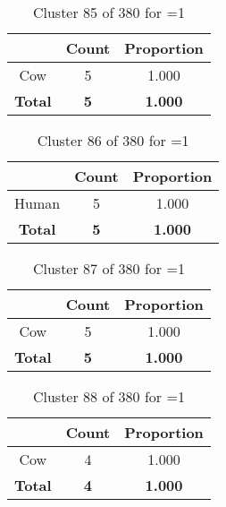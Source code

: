 \begin{table}[ht!]
\centering
\begin{tabular}{|c|c|c|}
\hline
\bf \Spec{} &\bf Count &\bf Proportion\\ \hline \hline
Cow & 5 & 1.000\\ \hline
\hline
\bf Total & \bf 5 & \bf 1.000\\ \hline
\end{tabular}
\label{tab:cluster:85:1}
\caption{Cluster 85 of 380 for \minneigh{}=1}
\end{table}

\begin{table}[ht!]
\centering
\begin{tabular}{|c|c|c|}
\hline
\bf \Spec{} &\bf Count &\bf Proportion\\ \hline \hline
Human & 5 & 1.000\\ \hline
\hline
\bf Total & \bf 5 & \bf 1.000\\ \hline
\end{tabular}
\label{tab:cluster:86:1}
\caption{Cluster 86 of 380 for \minneigh{}=1}
\end{table}

\begin{table}[ht!]
\centering
\begin{tabular}{|c|c|c|}
\hline
\bf \Spec{} &\bf Count &\bf Proportion\\ \hline \hline
Cow & 5 & 1.000\\ \hline
\hline
\bf Total & \bf 5 & \bf 1.000\\ \hline
\end{tabular}
\label{tab:cluster:87:1}
\caption{Cluster 87 of 380 for \minneigh{}=1}
\end{table}

\begin{table}[ht!]
\centering
\begin{tabular}{|c|c|c|}
\hline
\bf \Spec{} &\bf Count &\bf Proportion\\ \hline \hline
Cow & 4 & 1.000\\ \hline
\hline
\bf Total & \bf 4 & \bf 1.000\\ \hline
\end{tabular}
\label{tab:cluster:88:1}
\caption{Cluster 88 of 380 for \minneigh{}=1}
\end{table}


